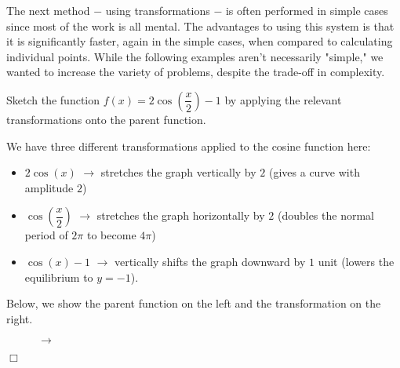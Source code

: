 \documentclass[lang=en,11pt]{elegantbook}
\begin{document}
The next method $-$ using transformations $-$ is often performed in simple cases since most of the work is all mental. The advantages to using this system is that it is significantly faster, again in the simple cases, when compared to calculating individual points. While the following examples aren't necessarily "simple," we wanted to increase the variety of problems, despite the trade-off in complexity.
\begin{example}
Sketch the function $f(x)=2\cos\left(\dfrac{x}{2}\right)-1$ by applying the relevant transformations onto the parent function.
\end{example}
\begin{solution}
We have three different transformations applied to the cosine function here: \begin{itemize}
    \item $2\cos(x)$ $\longrightarrow$ stretches the graph vertically by $2$ (gives a curve with amplitude $2$)
    \item $\cos\left(\dfrac{x}{2}\right)$ $\longrightarrow$ stretches the graph horizontally by $2$ (doubles the normal period of $2\pi$ to become $4\pi$)
    \item $\cos(x)-1$ $\longrightarrow$ vertically shifts the graph downward by $1$ unit (lowers the equilibrium to $y=-1$).
\end{itemize}
Below, we show the parent function on the left and the transformation on the right.
\begin{figure}[!h]
    \centering
      $\to$ 
\end{figure} $\Box$
\end{solution}
\end{document}
